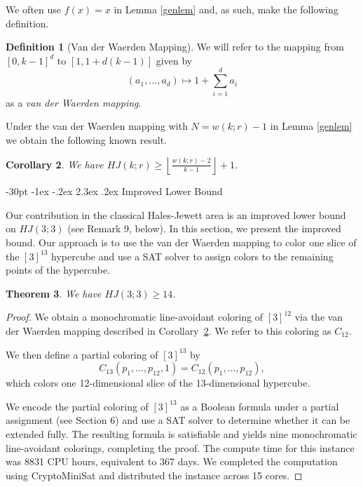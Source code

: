 \documentclass[11pt]{article}
\makeatletter
\newtheorem{thm}{Theorem}
\newtheorem{cor}[thm]{Corollary}
\theoremstyle{definition}
\newtheorem{defn}[thm]{Definition}
\renewcommand\section{\@startsection {section}{1}{\z@}%
{-30pt \@plus -1ex \@minus -.2ex}%
{2.3ex \@plus.2ex}%
{\normalfont\normalsize\bfseries}}
\makeatother
\begin{document}
We often use $f(x)=x$ in Lemma \ref{genlem} and, as such,
make the following definition.

\begin{defn}[Van der Waerden Mapping]\label{def:vdwmap}
    We will refer to the mapping from $[0,k-1]^d$ to $[1,1+d(k-1)]$
    given by
    \[(a_1, \dots, a_d) \mapsto 1 + \sum_{i=1}^{d} a_i\]
    as a {\it van
der Waerden mapping}.
\end{defn}

Under the van der Waerden mapping 
with $N=w(k;r)-1$ in Lemma \ref{genlem}  we obtain the following known result.

\begin{cor}\label{vdwmapcor}
We have $HJ(k;r) \geq \left\lfloor\frac{w(k;r)-2}{k-1}\right\rfloor+1.$
\end{cor}


\section{Improved Lower Bound}

Our  contribution in the classical Hales-Jewett area is an improved lower bound on $HJ(3;3)$ (see Remark 9, below). In this section, we present the improved bound.  Our approach is to use the van der Waerden mapping to color one slice
of the $[3]^{13}$ hypercube and use a SAT solver to assign colors to
the remaining points of the hypercube.




\begin{thm}\label{thm7} We have $HJ(3;3) \geq 14$.

\end{thm}

\begin{proof}
We obtain a monochromatic line-avoidant coloring of $[3]^{12}$ via the van der Waerden mapping described in Corollary~\ref{vdwmapcor}. We refer to this coloring as $C_{12}$.

We then define a partial coloring of $[3]^{13}$ by
\[
C_{13}(p_1,\dots,p_{12}, 1) = C_{12}(p_1,\dots,p_{12}),
\]
which colors one 12-dimensional slice of the 13-dimensional hypercube.


We encode the partial coloring of $[3]^{13}$ as a Boolean formula under a partial assignment (see Section 6) and use a SAT solver to determine whether it can be extended fully. The resulting formula is satisfiable and yields nine monochromatic line-avoidant colorings, completing the proof. The compute time for this instance was 8831 CPU hours, equivalent to 367 days. We completed the computation using CryptoMiniSat and distributed the instance across 15 cores. 
\end{proof}
\end{document}
